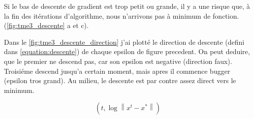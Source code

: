 \documentclass[a4paper,12pt]{article}
\begin{document}
Si le bas de descente de gradient est trop petit ou grande,
il y a une risque que, à la fin des itérations d'algorithme, nous n'arrivons pas à minimum de fonction.
(\autoref{fig:tme3_descente} a et c).

Dans le \autoref{fig:tme3_descente_direction} j'ai plotté le direction de descente (defini dans \autoref{equation:descente}) de chaque epsilon de figure
precedent. On peut deduire, que le premier ne descend pas, car son epsilon est negative (direction faux).
Troisiéme descend jusqu'a certain moment, mais apres il commence bugger (epsilon tros grand).
Au milieu, le descente est par contre assez direct vers le minimum.

\begin{equation}
\label{equation:descente}
	\left ( t, \log \left \| x^{t} - x^{*} \right  \| \right )
\end{equation}
\end{document}
